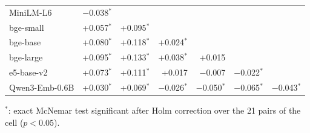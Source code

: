 \begin{table}[t]
\begin{tabular}{lrrrrrr}
MiniLM-L6 & $-$0.038$^{*}$ &  &  &  &  &  \\
bge-small & +0.057$^{*}$ & +0.095$^{*}$ &  &  &  &  \\
bge-base & +0.080$^{*}$ & +0.118$^{*}$ & +0.024$^{*}$ &  &  &  \\
bge-large & +0.095$^{*}$ & +0.133$^{*}$ & +0.038$^{*}$ & +0.015 &  &  \\
e5-base-v2 & +0.073$^{*}$ & +0.111$^{*}$ & +0.017 & $-$0.007 & $-$0.022$^{*}$ &  \\
Qwen3-Emb-0.6B & +0.030$^{*}$ & +0.069$^{*}$ & $-$0.026$^{*}$ & $-$0.050$^{*}$ & $-$0.065$^{*}$ & $-$0.043$^{*}$ \\
\bottomrule
\end{tabular}
\par\smallskip\parbox{\linewidth}{\footnotesize $^{*}$: exact McNemar test significant after Holm correction over the 21 pairs of the cell ($p<0.05$).}
\end{table}
